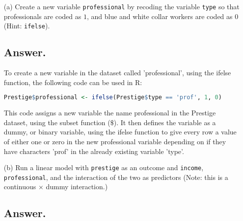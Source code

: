 \documentclass[12pt,letterpaper]{article}
\begin{document}
\newpage
\begin{enumerate}
	
	\item [(a)]
	Create a new variable \texttt{professional} by recoding the variable \texttt{type} so that professionals are coded as $1$, and blue and white collar workers are coded as $0$ (Hint: \texttt{ifelse}).
	\subsection*{Answer.}
	
	To create a new variable in the dataset called 'professional', using the ifelse function, the following code can be used in R:
	
	\begin{lstlisting}[language=R]
	 Prestige$professional <- ifelse(Prestige$type == 'prof', 1, 0)
	\end{lstlisting}
	This code assigns a new variable the name professional in the Prestige dataset, using the subset function ($\$$). It then defines the variable as a dummy, or binary variable, using the ifelse function to give every row a value of either one or zero in the new professional variable depending on if they have characters 'prof' in the already existing variable 'type'.
	
	\vspace{6cm}
	
	
	\item [(b)]
	Run a linear model with \texttt{prestige} as an outcome and \texttt{income}, \texttt{professional}, and the interaction of the two as predictors (Note: this is a continuous $\times$ dummy interaction.)
	\subsection*{Answer.}
	

\end{enumerate}
\end{document}
